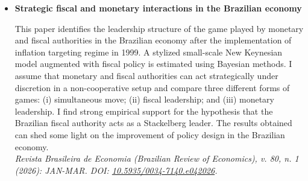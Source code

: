 

\begin{itemize}
    \item{\textbf{Strategic fiscal and monetary interactions in the Brazilian economy}

\small{This paper identifies the leadership structure of the game played by monetary and fiscal authorities in the Brazilian economy after the implementation of inflation targeting regime in 1999. A stylized small-scale New Keynesian model augmented with fiscal policy is estimated using Bayesian methods. I assume that monetary and fiscal authorities can act strategically under discretion in a non-cooperative setup and compare three different forms of games: (i) simultaneous move; (ii) fiscal leadership; and (iii) monetary leadership. I find strong empirical support for the hypothesis that the Brazilian fiscal authority acts as a Stackelberg leader. The results obtained can shed some light on the improvement of policy design in the Brazilian economy. \\ \emph{Revista Brasileira de Economia (Brazilian Review of Economics), v. 80, n. 1 (2026): JAN-MAR. DOI: \href{https://doi.org/10.5935/0034-7140.e042026}{10.5935/0034-7140.e042026}.}}}
\end{itemize}
